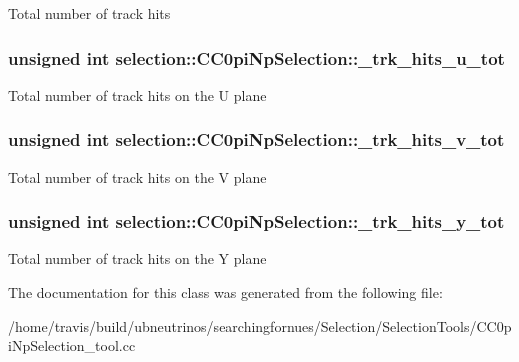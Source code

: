 Total number of track hits \hypertarget{classselection_1_1CC0piNpSelection_af7d0e867df8901ff3e531b4c1b96408a}{
\subsubsection[{\-\_\-trk\-\_\-hits\-\_\-u\-\_\-tot}]{\setlength{\rightskip}{0pt plus 5cm}unsigned int selection\-::\-C\-C0pi\-Np\-Selection\-::\-\_\-trk\-\_\-hits\-\_\-u\-\_\-tot\hspace{0.3cm}{\ttfamily [private]}}}\label{classselection_1_1CC0piNpSelection_af7d0e867df8901ff3e531b4c1b96408a}
Total number of track hits on the U plane \hypertarget{classselection_1_1CC0piNpSelection_a30fe5ccb6a299f7955125aa6c9d5923d}{
\subsubsection[{\-\_\-trk\-\_\-hits\-\_\-v\-\_\-tot}]{\setlength{\rightskip}{0pt plus 5cm}unsigned int selection\-::\-C\-C0pi\-Np\-Selection\-::\-\_\-trk\-\_\-hits\-\_\-v\-\_\-tot\hspace{0.3cm}{\ttfamily [private]}}}\label{classselection_1_1CC0piNpSelection_a30fe5ccb6a299f7955125aa6c9d5923d}
Total number of track hits on the V plane \hypertarget{classselection_1_1CC0piNpSelection_a76eb07fcb9190709464880c0ea7c4eba}{
\subsubsection[{\-\_\-trk\-\_\-hits\-\_\-y\-\_\-tot}]{\setlength{\rightskip}{0pt plus 5cm}unsigned int selection\-::\-C\-C0pi\-Np\-Selection\-::\-\_\-trk\-\_\-hits\-\_\-y\-\_\-tot\hspace{0.3cm}{\ttfamily [private]}}}\label{classselection_1_1CC0piNpSelection_a76eb07fcb9190709464880c0ea7c4eba}
Total number of track hits on the Y plane 

The documentation for this class was generated from the following file\-:\begin{DoxyCompactItemize}
\item 
/home/travis/build/ubneutrinos/searchingfornues/\-Selection/\-Selection\-Tools/C\-C0pi\-Np\-Selection\-\_\-tool.\-cc\end{DoxyCompactItemize}
